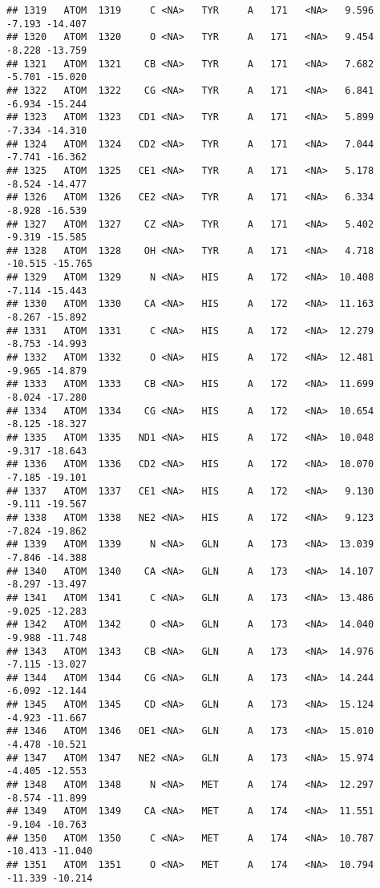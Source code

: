 \documentclass[
]{article}
\begin{document}
\begin{verbatim}
## 1319   ATOM  1319     C <NA>   TYR     A   171   <NA>   9.596  -7.193 -14.407
## 1320   ATOM  1320     O <NA>   TYR     A   171   <NA>   9.454  -8.228 -13.759
## 1321   ATOM  1321    CB <NA>   TYR     A   171   <NA>   7.682  -5.701 -15.020
## 1322   ATOM  1322    CG <NA>   TYR     A   171   <NA>   6.841  -6.934 -15.244
## 1323   ATOM  1323   CD1 <NA>   TYR     A   171   <NA>   5.899  -7.334 -14.310
## 1324   ATOM  1324   CD2 <NA>   TYR     A   171   <NA>   7.044  -7.741 -16.362
## 1325   ATOM  1325   CE1 <NA>   TYR     A   171   <NA>   5.178  -8.524 -14.477
## 1326   ATOM  1326   CE2 <NA>   TYR     A   171   <NA>   6.334  -8.928 -16.539
## 1327   ATOM  1327    CZ <NA>   TYR     A   171   <NA>   5.402  -9.319 -15.585
## 1328   ATOM  1328    OH <NA>   TYR     A   171   <NA>   4.718 -10.515 -15.765
## 1329   ATOM  1329     N <NA>   HIS     A   172   <NA>  10.408  -7.114 -15.443
## 1330   ATOM  1330    CA <NA>   HIS     A   172   <NA>  11.163  -8.267 -15.892
## 1331   ATOM  1331     C <NA>   HIS     A   172   <NA>  12.279  -8.753 -14.993
## 1332   ATOM  1332     O <NA>   HIS     A   172   <NA>  12.481  -9.965 -14.879
## 1333   ATOM  1333    CB <NA>   HIS     A   172   <NA>  11.699  -8.024 -17.280
## 1334   ATOM  1334    CG <NA>   HIS     A   172   <NA>  10.654  -8.125 -18.327
## 1335   ATOM  1335   ND1 <NA>   HIS     A   172   <NA>  10.048  -9.317 -18.643
## 1336   ATOM  1336   CD2 <NA>   HIS     A   172   <NA>  10.070  -7.185 -19.101
## 1337   ATOM  1337   CE1 <NA>   HIS     A   172   <NA>   9.130  -9.111 -19.567
## 1338   ATOM  1338   NE2 <NA>   HIS     A   172   <NA>   9.123  -7.824 -19.862
## 1339   ATOM  1339     N <NA>   GLN     A   173   <NA>  13.039  -7.846 -14.388
## 1340   ATOM  1340    CA <NA>   GLN     A   173   <NA>  14.107  -8.297 -13.497
## 1341   ATOM  1341     C <NA>   GLN     A   173   <NA>  13.486  -9.025 -12.283
## 1342   ATOM  1342     O <NA>   GLN     A   173   <NA>  14.040  -9.988 -11.748
## 1343   ATOM  1343    CB <NA>   GLN     A   173   <NA>  14.976  -7.115 -13.027
## 1344   ATOM  1344    CG <NA>   GLN     A   173   <NA>  14.244  -6.092 -12.144
## 1345   ATOM  1345    CD <NA>   GLN     A   173   <NA>  15.124  -4.923 -11.667
## 1346   ATOM  1346   OE1 <NA>   GLN     A   173   <NA>  15.010  -4.478 -10.521
## 1347   ATOM  1347   NE2 <NA>   GLN     A   173   <NA>  15.974  -4.405 -12.553
## 1348   ATOM  1348     N <NA>   MET     A   174   <NA>  12.297  -8.574 -11.899
## 1349   ATOM  1349    CA <NA>   MET     A   174   <NA>  11.551  -9.104 -10.763
## 1350   ATOM  1350     C <NA>   MET     A   174   <NA>  10.787 -10.413 -11.040
## 1351   ATOM  1351     O <NA>   MET     A   174   <NA>  10.794 -11.339 -10.214

\end{verbatim}
\end{document}
